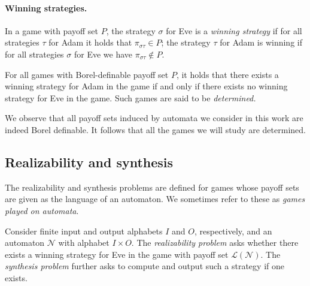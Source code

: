 \documentclass[runningheads,a4paper,draft]{llncs}
\newcommand{\eve}{Eve\xspace}
\newcommand{\adam}{Adam\xspace}
\newcommand{\calN}{\mathcal{N}}
\newcommand{\lang}[1]{\mathcal{L}({#1})}
\newcommand{\out}[2]{\pi_{#1#2}}
\begin{document}
\paragraph*{Winning strategies.}
In a game with payoff set $P$, the strategy $\sigma$ for \eve is a \emph{winning
strategy} if for all strategies $\tau$ for \adam it holds that
$\out{\sigma}{\tau} \in P$; the strategy $\tau$ for \adam is winning if for all
strategies $\sigma$ for \eve we have $\out{\sigma}{\tau} \not\in P$.

\begin{proposition}
  For all games with Borel-definable payoff set $P$, it holds that there
  exists a winning strategy for \adam in the game if and only if there exists
  no winning strategy for \eve in the game.  Such games are said to be \emph{determined.}
\end{proposition}
We observe that all payoff sets induced by automata we consider in this work
are indeed Borel definable. It follows that all the games we will study are
determined.

\subsection{Realizability and synthesis}
The realizability and synthesis problems are defined for games whose payoff sets
are given as the language of an automaton. We sometimes refer to these as
\emph{games played on automata}.
\begin{definition}[Problems]
  Consider finite input and output alphabets $I$ and $O$, respectively, and
  an automaton $\calN$ with alphabet $I \times O$.
  The \emph{realizability problem} asks whether
  there exists a winning strategy for \eve in the game with payoff set 
  $\lang{\calN}$. The \emph{synthesis problem}
  further asks to compute and output such a strategy if one exists.
\end{definition}
\end{document}
